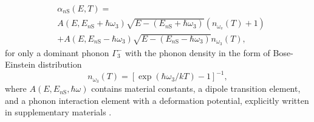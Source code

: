 \documentclass[aps,reprint,amsmath,amssymb,prb]{revtex4-1}
\begin{document}
\begin{equation}\label{eq:ElittwithT}
\begin{aligned}
&\alpha_{n\text{S}}(E,T) =\\
&A(E,E_{n\text{S}}+\hbar\omega_{3})\sqrt{E-(E_{n\text{S}}+\hbar\omega_{\text{3}})}\left(n_{\omega_{\text{e}}}(T)+1\right)\\ &+A(E,E_{n\text{S}}-\hbar\omega_{3})\sqrt{E-(E_{n\text{S}}-\hbar\omega_{\text{3}})}n_{\omega_{3}}(T), %
\end{aligned}
\end{equation}
for only a dominant phonon $\Gamma_3^-$ with the phonon density in the form of Bose-Einstein distribution
\begin{equation*}
n_{\omega_3}(T)=\left[\exp \left(\hbar \omega_3 / k T\right)-1\right]^{-1},
\end{equation*}
where $A(E, E_{n\text{S}}, \hbar\omega)$ contains material constants, a dipole transition element, and a phonon interaction element with a deformation potential, explicitly written in supplementary materials \cite{Schone2017}.
\end{document}
